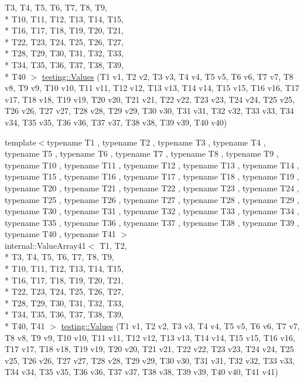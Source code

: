 \begin{DoxyCompactItemize}
T3, T4, T5, T6, T7, T8, T9, \\*
T10, T11, T12, T13, T14, T15, \\*
T16, T17, T18, T19, T20, T21, \\*
T22, T23, T24, T25, T26, T27, \\*
T28, T29, T30, T31, T32, T33, \\*
T34, T35, T36, T37, T38, T39, \\*
T40 $>$ \hyperlink{namespacetesting_adaa8b96d44c103a70e5c4a4b3430ef4d}{testing\-::\-Values} (T1 v1, T2 v2, T3 v3, T4 v4, T5 v5, T6 v6, T7 v7, T8 v8, T9 v9, T10 v10, T11 v11, T12 v12, T13 v13, T14 v14, T15 v15, T16 v16, T17 v17, T18 v18, T19 v19, T20 v20, T21 v21, T22 v22, T23 v23, T24 v24, T25 v25, T26 v26, T27 v27, T28 v28, T29 v29, T30 v30, T31 v31, T32 v32, T33 v33, T34 v34, T35 v35, T36 v36, T37 v37, T38 v38, T39 v39, T40 v40)
\item 
{\footnotesize template$<$typename T1 , typename T2 , typename T3 , typename T4 , typename T5 , typename T6 , typename T7 , typename T8 , typename T9 , typename T10 , typename T11 , typename T12 , typename T13 , typename T14 , typename T15 , typename T16 , typename T17 , typename T18 , typename T19 , typename T20 , typename T21 , typename T22 , typename T23 , typename T24 , typename T25 , typename T26 , typename T27 , typename T28 , typename T29 , typename T30 , typename T31 , typename T32 , typename T33 , typename T34 , typename T35 , typename T36 , typename T37 , typename T38 , typename T39 , typename T40 , typename T41 $>$ }\\internal\-::\-Value\-Array41$<$ T1, T2, \\*
T3, T4, T5, T6, T7, T8, T9, \\*
T10, T11, T12, T13, T14, T15, \\*
T16, T17, T18, T19, T20, T21, \\*
T22, T23, T24, T25, T26, T27, \\*
T28, T29, T30, T31, T32, T33, \\*
T34, T35, T36, T37, T38, T39, \\*
T40, T41 $>$ \hyperlink{namespacetesting_a51df725741cfcc9539c48885fc2728b0}{testing\-::\-Values} (T1 v1, T2 v2, T3 v3, T4 v4, T5 v5, T6 v6, T7 v7, T8 v8, T9 v9, T10 v10, T11 v11, T12 v12, T13 v13, T14 v14, T15 v15, T16 v16, T17 v17, T18 v18, T19 v19, T20 v20, T21 v21, T22 v22, T23 v23, T24 v24, T25 v25, T26 v26, T27 v27, T28 v28, T29 v29, T30 v30, T31 v31, T32 v32, T33 v33, T34 v34, T35 v35, T36 v36, T37 v37, T38 v38, T39 v39, T40 v40, T41 v41)
\item 

\end{DoxyCompactItemize}

